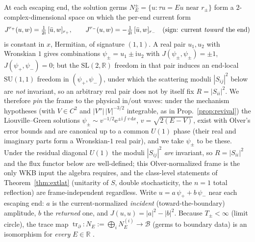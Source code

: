 \documentclass[11pt]{article}
\theoremstyle{definition}
\theoremstyle{remark}
\newcommand{\dd}{\mathrm{d}}
\newcommand{\ii}{\mathrm{i}}
\newcommand{\ee}{\mathrm{e}}
\newcommand{\btr}{\operatorname{tr}_{\partial}}
\begin{document}
At each escaping end, the solution germs
$N_{E}^{\pm}=\{u:\tau u=Eu\text{ near }r_{\pm}\}$ form a
$2$-complex-dimensional space on which the per-end current form
\[
J^{r_{+}}(u,w)=\tfrac{1}{2\ii}\,[\bar u,w]_{r_{+}},\qquad
J^{r_{-}}(u,w)=-\tfrac{1}{2\ii}\,[\bar u,w]_{r_{-}}
\quad(\text{sign: current \emph{toward} the end})
\]
is constant in $x$, Hermitian, of signature $(1,1)$. A real pair
$u_{1},u_{2}$ with Wronskian $1$ gives combinations
$\psi_{\pm}=u_{1}\pm\ii u_{2}$ with $J(\psi_{\pm},\psi_{\pm})=\pm1$,
$J(\psi_{+},\psi_{-})=0$; but the $\mathrm{SL}(2,\mathbb R)$ freedom in that
pair induces an end-local $\mathrm{SU}(1,1)$ freedom in
$(\psi_{+},\psi_{-})$, under which the scattering moduli $|S_{ij}|^{2}$
below are \emph{not} invariant, so an arbitrary real pair does not by
itself fix $R=|S_{ii}|^{2}$. We therefore \emph{pin} the frame to the
physical in/out waves: under the mechanism hypotheses (with $V\in C^{2}$
and $|V''|\,|V|^{-3/2}$ integrable, as in Prop.~\ref{prop:revival}) the Liouville--Green
solutions $\psi_{\pm}\sim v^{-1/2}\ee^{\pm\ii\int v\,\dd x}$,
$v=\sqrt{2(E-V)}$, exist with Olver's error bounds \cite{Olver} and are
canonical up to a common $U(1)$ phase (their real and imaginary parts form
a Wronskian-$1$ real pair), and we take $\psi_{\pm}$ to be these. Under the
residual diagonal $U(1)$ the moduli $|S_{ij}|^{2}$ \emph{are} invariant, so
$R=|S_{ii}|^{2}$ and the flux functor below are well-defined; this
Olver-normalized frame is the only WKB input the algebra requires, and the
class-level statements of Theorem~\ref{thm:extlat} (unitarity of $S$, double
stochasticity, the $n=1$ total reflection) are frame-independent regardless.
Write $u=a\,\psi_{+}+b\,\psi_{-}$ near each escaping end: $a$
is the current-normalized \emph{incident} (toward-the-boundary)
amplitude, $b$ the \emph{returned} one, and $J(u,u)=|a|^{2}-|b|^{2}$.
Because $T_{\pm}<\infty$ (limit circle), the trace map
$\btr:N_{E}:=\bigoplus_{i}N_{E}^{(i)}\to\mathcal B$ (germs to boundary
data) is an isomorphism for \emph{every} $E\in\mathbb{R}$ \cite{Zettl}.
\end{document}
